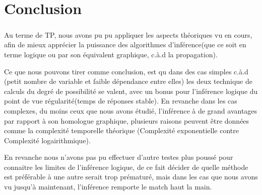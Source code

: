 \documentclass[]{report}
\begin{document}
	\chapter{Conclusion}
	\paragraph{}
	Au terme de TP, nous avons pu pu appliquer les aspects théoriques vu en cours, afin de mieux apprécier la puissance des
	algorithmes d'inférence(que ce soit en terme logique ou par son équivalent graphique, c.à.d la propagation).
	\par 
	Ce que nous pouvons tirer comme conclusion, est qu dans des cas simples c.à.d (petit nombre de variable et faible dépendance
	entre elles) les deux technique de calculs du degré de possibilité se valent, avec un bonus pour l'inférence logique du point
	de vue régularité(temps de réponses stable). En revanche dans les cas complexes, du moins ceux que nous avons étudié, l'inférence
	à de grand avantages par rapport à son homologue graphique, plusieurs raisons peuvent être données comme la complexité 
	temporelle théorique (Complexité exponentielle contre Complexité logairithmique).
	\par 
	En revanche nous n'avons pas pu effectuer d'autre testes plus poussé pour connaitre les limites de l'inférence logique, de ce 
	fait décider de quelle méthode est préférable à une autre serait trop prématuré, mais dans les cas que nous avons vu jusqu'à 
	maintenant, l'inférence remporte le match haut la main.
\end{document}
